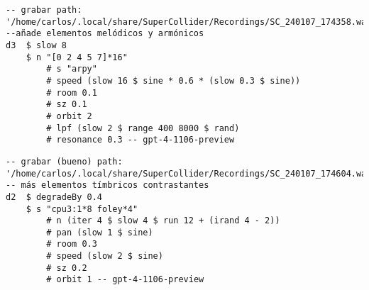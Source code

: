 \begin{minipage}[t]{1\textwidth}
    \centering
    \begin{lstlisting}[style=SuperCollider-IDE, language=ExtendedHaskell, basicstyle=\footnotesize\ttfamily, numbers=none]
-- grabar path: '/home/carlos/.local/share/SuperCollider/Recordings/SC_240107_174358.wav'
--añade elementos melódicos y armónicos
d3  $ slow 8 
    $ n "[0 2 4 5 7]*16" 
        # s "arpy" 
        # speed (slow 16 $ sine * 0.6 * (slow 0.3 $ sine)) 
        # room 0.1 
        # sz 0.1 
        # orbit 2 
        # lpf (slow 2 $ range 400 8000 $ rand) 
        # resonance 0.3 -- gpt-4-1106-preview                    
    \end{lstlisting}
    \vspace{1cm}
\end{minipage}







\begin{minipage}[t]{1\textwidth}
    \centering
    \begin{lstlisting}[style=SuperCollider-IDE, language=ExtendedHaskell, basicstyle=\footnotesize\ttfamily, numbers=none]
-- grabar (bueno) path: '/home/carlos/.local/share/SuperCollider/Recordings/SC_240107_174604.wav'
-- más elementos tímbricos contrastantes
d2  $ degradeBy 0.4 
    $ s "cpu3:1*8 foley*4" 
        # n (iter 4 $ slow 4 $ run 12 + (irand 4 - 2)) 
        # pan (slow 1 $ sine) 
        # room 0.3 
        # speed (slow 2 $ sine) 
        # sz 0.2 
        # orbit 1 -- gpt-4-1106-preview                  
    \end{lstlisting}
    \vspace{1cm}
\end{minipage}








